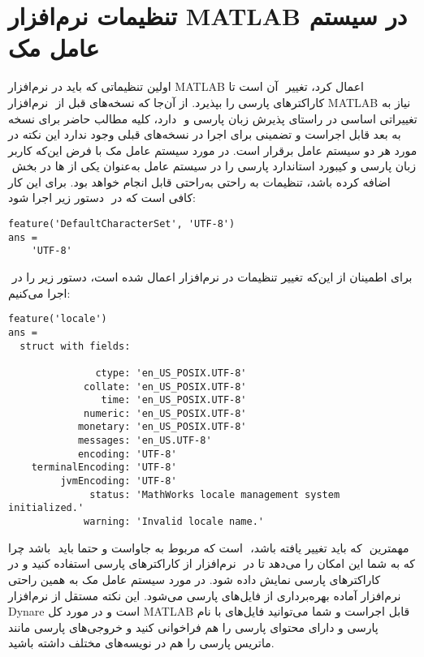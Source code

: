 \documentclass[12pt]{article}
\begin{document}
\section{تنظیمات نرم‌افزار MATLAB در سیستم عامل مک}
اولین تنظیماتی که باید در نرم‌افزار MATLAB اعمال کرد، تغییر ‪‬‬‬ آن است تا کاراکترهای پارسی را بپذیرد. از آن‌جا که نسخه‌های قبل از ‪‬‬‬‬‬ نرم‌افزار MATLAB نیاز به تغییراتی اساسی در راستای پذیرش زبان پارسی و ‪‬‬‬ دارد، کلیه مطالب حاضر برای نسخه ‪‬‬‬ به بعد قابل اجراست و تضمینی برای اجرا در نسخه‌های قبلی وجود ندارد این نکته در مورد هر دو سیستم عامل برقرار است. در مورد سیستم عامل مک با فرض این‌که کاربر زبان پارسی  و کیبورد استاندارد پارسی را در سیستم عامل به‌عنوان یکی از ‪‬‬‬ها در بخش ‪‬‬‬ اضافه کرده باشد، تنظیمات به راحتی به‌راحتی قابل انجام خواهد بود. برای این کار کافی است که در ‪‬‬‬ دستور زیر اجرا شود:
\begin{latin}
\begin{lstlisting}[basicstyle=\scriptsize]
feature('DefaultCharacterSet', 'UTF-8')
ans =
    'UTF-8'
\end{lstlisting}
\end{latin}
برای اطمینان از این‌که تغییر تنظیمات در نرم‌افزار اعمال شده است، دستور زیر را در ‪‬‬‬  اجرا می‌کنیم:
 \begin{latin}
\begin{lstlisting}[basicstyle=\scriptsize]
feature('locale')
ans = 
  struct with fields:

               ctype: 'en_US_POSIX.UTF-8'
             collate: 'en_US_POSIX.UTF-8'
                time: 'en_US_POSIX.UTF-8'
             numeric: 'en_US_POSIX.UTF-8'
            monetary: 'en_US_POSIX.UTF-8'
            messages: 'en_US.UTF-8'
            encoding: 'UTF-8'
    terminalEncoding: 'UTF-8'
         jvmEncoding: 'UTF-8'
              status: 'MathWorks locale management system initialized.'
             warning: 'Invalid locale name.'
\end{lstlisting}
\end{latin}
مهمترین ‪‬‬‬ که باید تغییر یافته باشد،  ‪‬‬‬ است که مربوط به جاواست و حتما باید ‪‬‬‬‬ باشد چرا که به شما این امکان را می‌دهد تا در ‪‬‬ نرم‌افزار از کاراکترهای پارسی استفاده کنید و در ‪‬‬‬   کاراکترهای پارسی نمایش داده شود.  در مورد سیستم عامل مک به همین راحتی نرم‌افزار آماده بهره‌برداری از فایل‌های پارسی می‌شود. این نکته مستقل از نرم‌افزار Dynare است و در مورد کل MATLAB قابل اجراست و شما می‌توانید فایل‌های با نام پارسی و دارای محتوای پارسی را هم فراخوانی کنید و خروجی‌های پارسی مانند ماتریس پارسی را هم در نویسه‌های مختلف داشته باشید.
\end{document}
